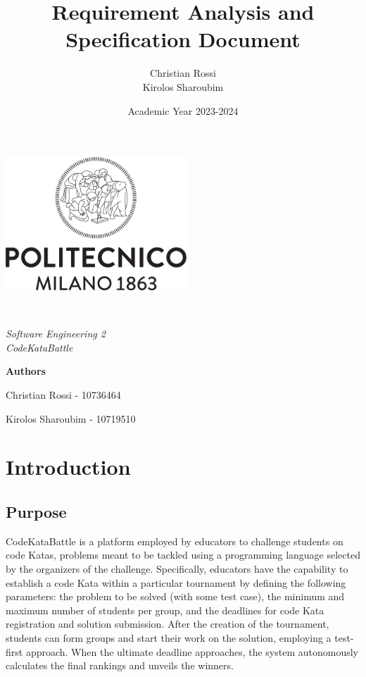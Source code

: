 \documentclass[12pt, a4paper]{report}
\title{Requirement Analysis and Specification Document}
\author{Christian Rossi \\ Kirolos Sharoubim}
\date{Academic Year 2023-2024}
\begin{document}
\begin{titlingpage} 
    \begin{center}
        \includegraphics[height=5cm]{images/polimi.png}\\
        \vspace{4cm}
        \begin{huge} 
            \textbf{\thetitle} \\
        \end{huge}
        \vspace{0.3cm}
        \begin{Large}
            \textit{Software Engineering 2 \\ CodeKataBattle} \\
        \end{Large}
    \end{center}
    \vspace{6.9cm}
        \begin{center}
            \textbf{Authors}

            Christian Rossi - 10736464

            Kirolos Sharoubim - 10719510
    \end{center}
\end{titlingpage}

\tableofcontents

\chapter{Introduction}
    \section{Purpose}
    CodeKataBattle is a platform employed by educators to challenge students on code Katas, problems meant to be tackled using a programming language selected by the organizers of the challenge.
    Specifically, educators have the capability to establish a code Kata within a particular tournament by defining the following parameters: the problem to be solved (with some test case), the minimum and maximum number of students per group, and the deadlines for code Kata registration and solution submission.
    After the creation of the tournament, students can form groups and start their work on the solution, employing a test-first approach. 
    When the ultimate deadline approaches, the system autonomously calculates the final rankings and unveils the winners.
\end{document}
